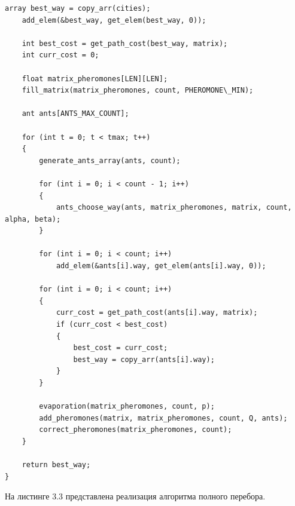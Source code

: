 \documentclass[12pt]{report}
\begin{document}
\begin{lstlisting}[label=some-code,caption=Реализация муравьиного алгоритма]
	array best_way = copy_arr(cities);
	add_elem(&best_way, get_elem(best_way, 0));
	
	int best_cost = get_path_cost(best_way, matrix);
	int curr_cost = 0;
	
	float matrix_pheromones[LEN][LEN];
	fill_matrix(matrix_pheromones, count, PHEROMONE\_MIN);

	ant ants[ANTS_MAX_COUNT];

	for (int t = 0; t < tmax; t++)
	{
		generate_ants_array(ants, count);

		for (int i = 0; i < count - 1; i++)
		{
			ants_choose_way(ants, matrix_pheromones, matrix, count, alpha, beta);
		}

		for (int i = 0; i < count; i++)
			add_elem(&ants[i].way, get_elem(ants[i].way, 0));

		for (int i = 0; i < count; i++)
		{
			curr_cost = get_path_cost(ants[i].way, matrix);
			if (curr_cost < best_cost)
			{
				best_cost = curr_cost;
				best_way = copy_arr(ants[i].way);
			}
		}

		evaporation(matrix_pheromones, count, p);
		add_pheromones(matrix, matrix_pheromones, count, Q, ants);
		correct_pheromones(matrix_pheromones, count);
	}

	return best_way;
}

\end{lstlisting}

На листинге 3.3 представлена реализация алгоритма полного перебора.
\end{document}
